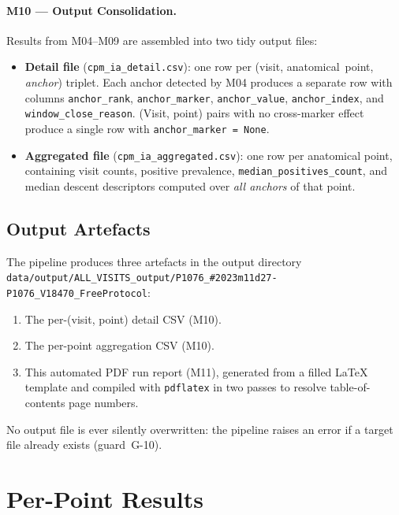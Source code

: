\documentclass[a4paper,11pt]{article}
\begin{document}
\paragraph{M10 --- Output Consolidation.}
Results from M04--M09 are assembled into two tidy output files:
\begin{itemize}
  \item \textbf{Detail file} (\texttt{cpm\_ia\_detail.csv}): one row per
        (visit, anatomical~point, \emph{anchor}) triplet. Each anchor detected by M04
        produces a separate row with columns \texttt{anchor\_rank},
        \texttt{anchor\_marker}, \texttt{anchor\_value}, \texttt{anchor\_index},
        and \texttt{window\_close\_reason}.
        (Visit, point) pairs with no cross-marker effect produce a single row with
        \texttt{anchor\_marker = None}.
  \item \textbf{Aggregated file} (\texttt{cpm\_ia\_aggregated.csv}): one row per
        anatomical point, containing visit counts, positive prevalence,
        \texttt{median\_positives\_count}, and median descent descriptors computed over
        \emph{all anchors} of that point.
\end{itemize}

\subsection{Output Artefacts}

The pipeline produces three artefacts in the output directory \texttt{data/output/ALL\_VISITS\_output/P1076\_\#2023m11d27-P1076\_V18470\_FreeProtocol}:
\begin{enumerate}
  \item The per-(visit, point) detail CSV (M10).
  \item The per-point aggregation CSV (M10).
  \item This automated PDF run report (M11), generated from a filled \LaTeX{} template
        and compiled with \texttt{pdflatex} in two passes to resolve table-of-contents
        page numbers.
\end{enumerate}
No output file is ever silently overwritten: the pipeline raises an error if a target
file already exists (guard~G-10).

\section{Per-Point Results}
\end{document}
